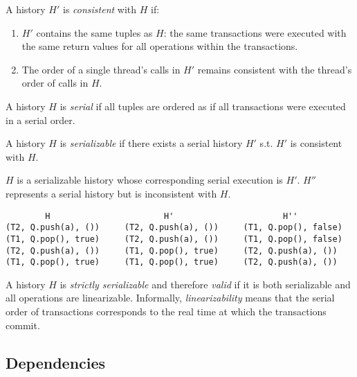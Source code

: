 \begin{defn}
    A history $H'$ is \emph{consistent} with $H$ if:
    \begin{enumerate}
        \item $H'$ contains the same tuples as $H$: the same transactions were executed with the same return values for all operations within the transactions.
        \item The order of a single thread's calls in $H'$ remains consistent with the thread's order of calls in $H$.
    \end{enumerate}
\end{defn}

\begin{defn}
    A history $H$ is \emph{serial} if all tuples are ordered as if all transactions were executed in a serial order.
\end{defn}
\begin{defn}
    A history $H$ is \emph{serializable} if there exists a serial history $H'$ s.t. $H'$ is consistent with $H$.

\end{defn}

\begin{eg}
$H$ is a serializable history whose corresponding serial execution is $H'$. $H''$ represents a serial history but is inconsistent with $H$.
    \singlespacing   
\begin{lstlisting}
        H                       H'                      H'' 
(T2, Q.push(a), ())     (T2, Q.push(a), ())     (T1, Q.pop(), false)
(T1, Q.pop(), true)     (T2, Q.push(a), ())     (T1, Q.pop(), false)
(T2, Q.push(a), ())     (T1, Q.pop(), true)     (T2, Q.push(a), ())
(T1, Q.pop(), true)     (T1, Q.pop(), true)     (T2, Q.push(a), ()) 
\end{lstlisting}
    \doublespacing
\end{eg}

\begin{defn}
    A history $H$ is \emph{strictly serializable} and therefore \emph{valid} if it is both serializable and all operations are linearizable. Informally, \emph{linearizability} means that the serial order of transactions corresponds to the real time at which the transactions commit.
\end{defn}

\subsection{Dependencies}

